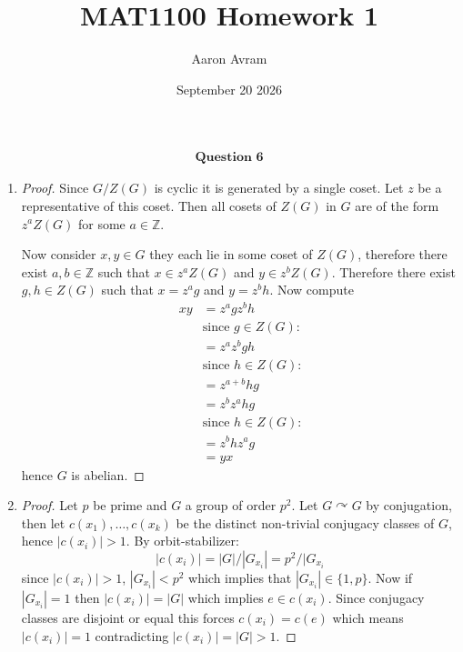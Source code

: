 \documentclass[12pt]{article}
\title{MAT1100 Homework 1}
\author{Aaron Avram}
\date{September 20 2026}
\begin{document}
\newtheorem{definition}{Definition}
\newtheorem{theorem}{Theorem}
\newtheorem{claim}{Claim}
\newtheorem{corollary}{Corollary}

\maketitle

\begin{align*}
    \textbf{Question 6}
\end{align*}

\begin{enumerate}
    \item[(a)]
    \begin{proof}
    Since $G/Z(G)$ is cyclic it is generated by a single coset. Let $z$ be a representative of this coset.
    Then all cosets of $Z(G)$ in $G$ are of the form $z^aZ(G)$ for some $a \in \mathbb Z$.

    Now consider $x, y \in G$ they each lie in some coset of $Z(G)$, therefore there exist $a, b \in \mathbb Z$
    such that $x \in z^aZ(G)$ and $y \in z^bZ(G)$. Therefore there exist $g, h \in Z(G)$ such that
    $x = z^ag$ and $y = z^bh$. Now compute
    \begin{align*}
        xy &= z^agz^bh \\
        &\text{since $g \in Z(G)$:} \\
        &= z^az^bgh \\
        &\text{since $h \in Z(G)$:} \\
        &= z^{a+b}hg \\
        &= z^bz^ahg \\
        &\text{since $h \in Z(G)$:} \\
        &= z^bhz^ag \\
        &= yx
    \end{align*}
    hence $G$ is abelian.
    \end{proof}

    \item[(b)]
    \begin{proof}
        Let $p$ be prime and $G$ a group of order $p^2$. Let $G \curvearrowright G$
        by conjugation, then let $c(x_1), \ldots, c(x_k)$ be the distinct non-trivial conjugacy classes
        of $G$, hence $|c(x_i)| > 1$. By orbit-stabilizer:
        \[ |c(x_i)| = |G|/|G_{x_i}| = p^2/|G_{x_i} \]
        since $|c(x_i)| > 1$, $|G_{x_i}| < p^2$ which implies that $|G_{x_i}| \in \{ 1, p \}$.
        Now if $|G_{x_i}| = 1$ then $|c(x_i)| = |G|$ which implies $e \in c(x_i)$.
        Since conjugacy classes are disjoint or equal this forces $c(x_i) = c(e)$
        which means $|c(x_i)| = 1$ contradicting $|c(x_i)| = |G| > 1 $.


\end{proof}
\end{enumerate}
\end{document}
